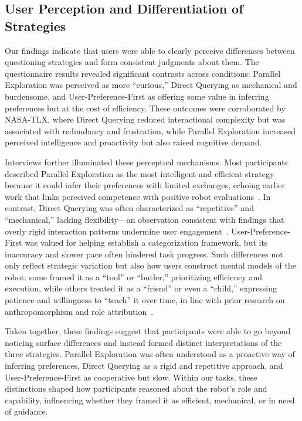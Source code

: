 \documentclass[sigconf,authordraft]{acmart}
\begin{document}
\subsection{User Perception and Differentiation of Strategies}
Our findings indicate that users were able to clearly perceive differences between questioning strategies and form consistent judgments about them. The questionnaire results revealed significant contrasts across conditions: Parallel Exploration was perceived as more “curious,” Direct Querying as mechanical and burdensome, and User-Preference-First as offering some value in inferring preferences but at the cost of efficiency. These outcomes were corroborated by NASA-TLX, where Direct Querying reduced interactional complexity but was associated with redundancy and frustration, while Parallel Exploration increased perceived intelligence and proactivity but also raised cognitive demand. 

Interviews further illuminated these perceptual mechanisms. Most participants described Parallel Exploration as the most intelligent and efficient strategy because it could infer their preferences with limited exchanges, echoing earlier work that links perceived competence with positive robot evaluations~\cite{bartneck2009measurement}. In contrast, Direct Querying was often characterized as “repetitive” and “mechanical,” lacking flexibility—an observation consistent with findings that overly rigid interaction patterns undermine user engagement~\cite{naneva2020systematic}. User-Preference-First was valued for helping establish a categorization framework, but its inaccuracy and slower pace often hindered task progress. Such differences not only reflect strategic variation but also how users construct mental models of the robot: some framed it as a “tool” or “butler,” prioritizing efficiency and execution, while others treated it as a “friend” or even a “child,” expressing patience and willingness to “teach” it over time, in line with prior research on anthropomorphism and role attribution~\cite{de2016almost}. 

Taken together, these findings suggest that participants were able to go beyond noticing surface differences and instead formed distinct interpretations of the three strategies. Parallel Exploration was often understood as a proactive way of inferring preferences, Direct Querying as a rigid and repetitive approach, and User-Preference-First as cooperative but slow. Within our tasks, these distinctions shaped how participants reasoned about the robot’s role and capability, influencing whether they framed it as efficient, mechanical, or in need of guidance.
\end{document}
